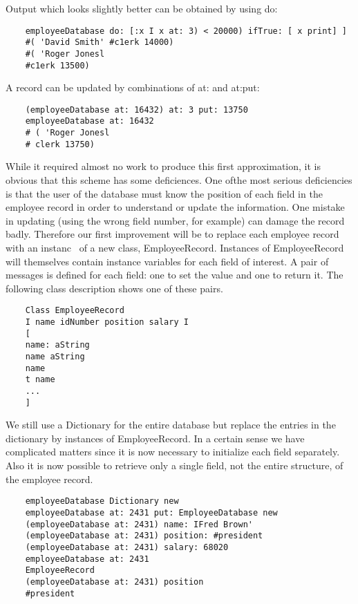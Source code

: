Output which looks slightly better can be obtained by using do:

\begin{lstlisting}
    employeeDatabase do: [:x I x at: 3) < 20000) ifTrue: [ x print] ]
    #( 'David Smith' #c1erk 14000)
    #( 'Roger Jonesl
    #c1erk 13500)
\end{lstlisting}

A record can be updated by combinations of at: and at:put:

\begin{lstlisting}
    (employeeDatabase at: 16432) at: 3 put: 13750
    employeeDatabase at: 16432
    # ( 'Roger Jonesl
    # clerk 13750)
\end{lstlisting}

While it required almost no work to produce this first approximation,
it is obvious that this scheme has some deficiences. One ofthe most serious
deficiencies is that the user of the database must know the position of each
field in the employee record in order to understand or update the information. One mistake in updating (using the wrong field number, for example) can damage the record badly. Therefore our first improvement will
be to replace each employee record with an instanc~ of a new class, EmployeeRecord. Instances of EmployeeRecord will themselves contain
instance variables for each field of interest. A pair of messages is defined
for each field: one to set the value and one to return it. The following class
description shows one of these pairs.

\begin{lstlisting}
    Class EmployeeRecord
    I name idNumber position salary I
    [
    name: aString
    name aString
    name
    t name
    ...
    ]
\end{lstlisting}

We still use a Dictionary for the entire database but replace the entries
in the dictionary by instances of EmployeeRecord. In a certain sense we
have complicated matters since it is now necessary to initialize each field
separately. Also it is now possible to retrieve only a single field, not the
entire structure, of the employee record.

\begin{lstlisting}
    employeeDatabase Dictionary new
    employeeDatabase at: 2431 put: EmployeeDatabase new
    (employeeDatabase at: 2431) name: IFred Brown'
    (employeeDatabase at: 2431) position: #president
    (employeeDatabase at: 2431) salary: 68020
    employeeDatabase at: 2431
    EmployeeRecord
    (employeeDatabase at: 2431) position
    #president
\end{lstlisting}

